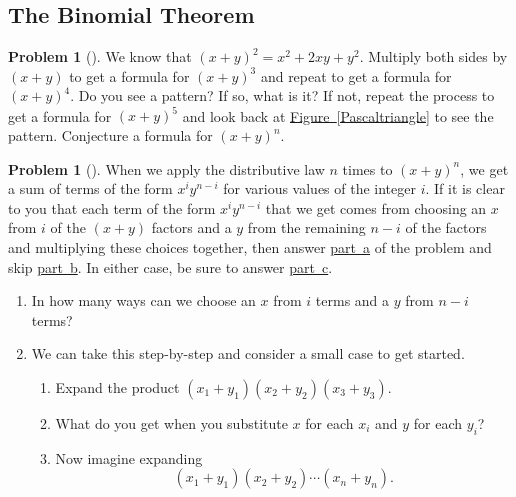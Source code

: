 \documentclass[10pt,]{book}
\theoremstyle{plain}
\theoremstyle{definition}
\newtheorem{activity}[project]{Problem}
\theoremstyle{definition}
\numberwithin{equation}{chapter}
\begin{document}
\subsection[{The Binomial Theorem}]{The Binomial Theorem}\label{subsection-8}
\begin{activity}[] \label{Conjecturebinomthm}
We know that \((x+y)^2 = x^2+2xy+y^2\). Multiply both sides by \((x+y)\) to get a formula for \((x+y)^3\) and repeat to get a formula for \((x+y)^4\). Do you see a pattern? If so, what is it? If not, repeat the process to get a formula for \((x+y)^5\) and look back at \hyperref[Pascaltriangle]{Figure~\ref{Pascaltriangle}} to see the pattern. Conjecture a formula for \((x+y)^n\).%
\end{activity}
\begin{activity}[] \label{activity-54}
When we apply the distributive law \(n\) times to \((x+y)^n\), we get a sum of terms of the form \(x^iy^{n-i}\) for various values of the integer \(i\). If it is clear to you that each term of the form \(x^iy^{n-i}\) that we get comes from choosing an \(x\) from \(i\) of the \((x+y)\) factors and a \(y\) from the remaining \(n-i\) of the factors and multiplying these choices together, then answer \hyperref[bin-thm-short]{part~a} of the problem and skip \hyperref[bin-thm-long]{part~b}. In either case, be sure to answer \hyperref[bin-thm-concl]{part~c}.%
\begin{enumerate}[font=\bfseries,label=(\alph*),ref=\alph*]
\item\label{bin-thm-short} \marginsymbol[-2.5em]{} In how many ways can we choose an \(x\) from \(i\) terms and a \(y\) from \(n-i\) terms?%
\item\label{bin-thm-long} \marginsymbol[-2.5em]{} We can take this step-by-step and consider a small case to get started.%
\begin{enumerate}[font=\bfseries,label=(\roman*),ref=\theenumi.\roman*]
\item\label{task-67} \marginsymbol[-2.5em]{} Expand the product \((x_1 +y_1)(x_2 +y_2)(x_3+y_3)\).%
\item\label{task-68} \marginsymbol[-2.5em]{} What do you get when you substitute \(x\) for each \(x_i\) and \(y\) for each \(y_i\)?%
\item\label{task-69} \marginsymbol[-2.5em]{} Now imagine expanding%
\begin{equation*}
(x_1+y_1)(x_2+y_2)\cdots (x_n+y_n).
\end{equation*}

\end{enumerate}
\end{enumerate}
\end{activity}
\end{document}
